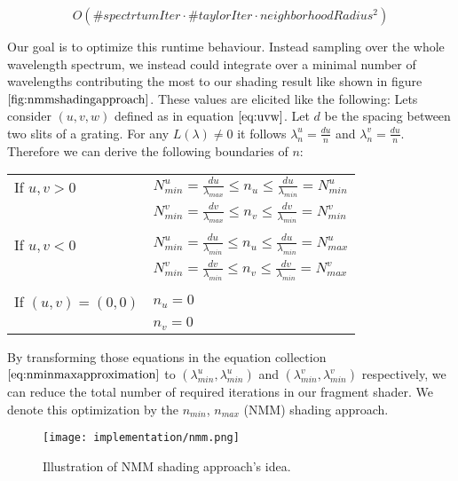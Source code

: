 \begin{equation}
O(\#spectrtumIter \cdot \#taylorIter \cdot neighborhoodRadius^2)
\end{equation}
 
Our goal is to optimize this runtime behaviour. Instead sampling over the whole wavelength spectrum, we instead could integrate over a minimal number of  wavelengths contributing the most to our shading result like shown in figure $\ref{fig:nmmshadingapproach}$. These values are elicited like the following: Lets consider $(u,v,w)$ defined as in equation $\ref{eq:uvw}$. Let $d$ be the spacing between two slits of a grating. For any $L(\lambda) \neq 0$ it follows $\lambda_{n}^{u} = \frac{d u}{n}$ and $\lambda_{n}^{v} = \frac{d u}{n}$. Therefore we can derive the following boundaries of $n$:

\begin{table}[H]
  \centering 
  \begin{tabular}{l l}
    If $u,v > 0$ & $N_{min}^{u} = \frac{d u}{\lambda_{max}} \leq n_{u} \leq \frac{d u}{\lambda_{min}} = N_{min}^{u}$ \\  
    & $N_{min}^{v} = \frac{d v}{\lambda_{max}} \leq n_{v} \leq \frac{d v}{\lambda_{min}} = N_{min}^{v}$ \\
    & \\
    If $u,v < 0$ & $N_{min}^{u} = \frac{d u}{\lambda_{min}} \leq n_{u} \leq \frac{d u}{\lambda_{min}} = N_{max}^{u}$ \\
    & $N_{min}^{v} = \frac{d v}{\lambda_{min}} \leq n_{v} \leq \frac{d v}{\lambda_{min}} = N_{max}^{v}$ \\
    & \\
    If $(u,v)=(0,0)$ & $n_u = 0$ \\
    & $n_v = 0$ \\
  \end{tabular} 
  \label{eq:nminmaxapproximation}
\end{table}

By transforming those equations in the equation collection $\ref{eq:nminmaxapproximation}$ to $(\lambda_{min}^{u}, \lambda_{min}^{u})$ and $(\lambda_{min}^{v}, \lambda_{min}^{v})$ respectively, we can reduce the total number of required iterations in our fragment shader. We denote this optimization by the $n_{min}$, $n_{max}$ (NMM) shading approach. 

\begin{figure}[H]
  \centering
  \texttt{[image: implementation/nmm.png]}
  \caption[NMM Shading Approach]{Illustration of NMM shading approach's idea.}
  \label{fig:nmmshadingapproach}
\end{figure}


